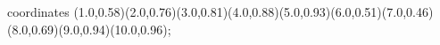 					coordinates { (1.0,0.58)(2.0,0.76)(3.0,0.81)(4.0,0.88)(5.0,0.93)(6.0,0.51)(7.0,0.46)(8.0,0.69)(9.0,0.94)(10.0,0.96)};